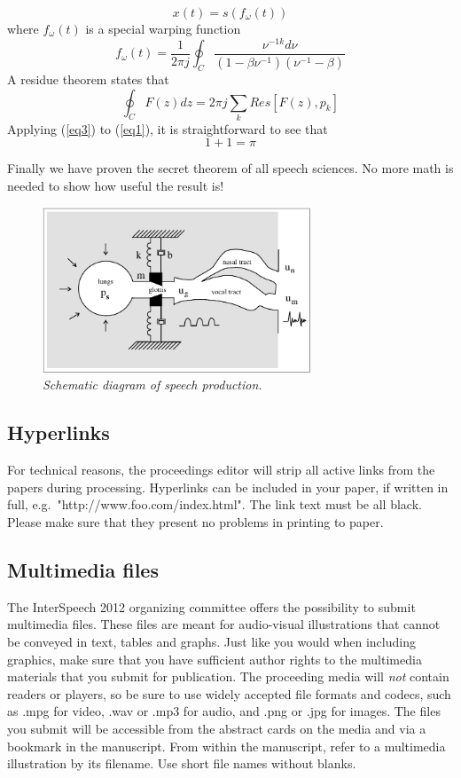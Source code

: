 \documentclass[a4paper]{article}
\begin{document}
\begin{equation}
x(t) = s(f_\omega(t))
\label{eq1}
\end{equation}
where \(f_\omega(t)\) is a special warping function
\begin{equation}
f_\omega(t)=\frac{1}{2\pi j}\oint_C \frac{\nu^{-1k}d\nu}
{(1-\beta\nu^{-1})(\nu^{-1}-\beta)}
\label{eq2}
\end{equation}
A residue theorem states that
\begin{equation}
\oint_C F(z)dz=2 \pi j \sum_k Res[F(z),p_k]
\label{eq3}
\end{equation}
Applying (\ref{eq3}) to (\ref{eq1}), 
it is straightforward to see that
\begin{equation}
1 + 1 = \pi
\label{eq4}
\end{equation}

Finally we have proven the secret theorem of all speech sciences. 
No more math is needed to show how useful the result is! 

\begin{figure}[t]
\centerline{\includegraphics[width=80mm]{figure}}
\caption{{\it Schematic diagram of speech production.}}  
\label{spprod}
\end{figure}


\subsection{Hyperlinks}
For technical reasons, the proceedings editor will strip all active links from the papers during processing.
Hyperlinks can be included in your paper, if written in full, e.\thinspace{}g.\ "http://www.foo.com/index.html".
The link text must be all black.
Please make sure that they present no problems in printing to paper.


\subsection{Multimedia files}
The InterSpeech 2012 organizing committee offers the possibility to submit multimedia files.
These files are meant for audio-visual illustrations that cannot be conveyed in text, tables and graphs.
Just like you would when including graphics, make sure that you have sufficient author rights to the multimedia materials that you submit for publication.
The proceeding media will \emph{not} contain readers or players, so be sure to use widely accepted file formats and codecs, such as .mpg for video, .wav or .mp3 for audio,  and .png or .jpg for images.
The files you submit will be accessible from the abstract cards on the media and via a bookmark in the manuscript.
From within the manuscript, refer to a multimedia illustration by its filename.
Use short file names without blanks.
\end{document}
